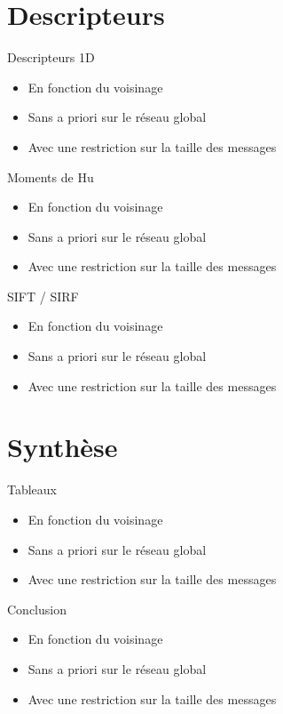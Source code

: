 \documentclass[xcolor=table]{beamer}
\begin{document}

\section{Descripteurs}

	\begin{frame}{Descripteurs 1D}
		\begin{itemize}
			\item En fonction du voisinage
			\item Sans a priori sur le réseau global
			\item Avec une restriction sur la taille des messages
		\end{itemize}
	\end{frame}

	\begin{frame}{Moments de Hu}
		\begin{itemize}
			\item En fonction du voisinage
			\item Sans a priori sur le réseau global
			\item Avec une restriction sur la taille des messages
		\end{itemize}
	\end{frame}

	\begin{frame}{SIFT / SIRF}
		\begin{itemize}
			\item En fonction du voisinage
			\item Sans a priori sur le réseau global
			\item Avec une restriction sur la taille des messages
		\end{itemize}
	\end{frame}

\section{Synthèse}

	\begin{frame}{Tableaux}
		\begin{itemize}
			\item En fonction du voisinage
			\item Sans a priori sur le réseau global
			\item Avec une restriction sur la taille des messages
		\end{itemize}
	\end{frame}

	\begin{frame}{Conclusion}
		\begin{itemize}
			\item En fonction du voisinage
			\item Sans a priori sur le réseau global
			\item Avec une restriction sur la taille des messages
		\end{itemize}
	\end{frame}
\end{document}
